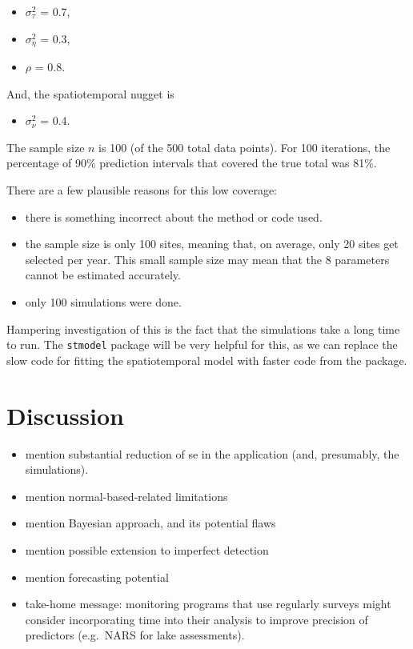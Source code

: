 \documentclass[]{interact}
\theoremstyle{plain}%
\theoremstyle{definition}
\theoremstyle{remark}
\def\tightlist{}
\begin{document}
\begin{itemize}
\tightlist
\item
  \(\sigma^2_{\tau}\) = 0.7,
\item
  \(\sigma^2_{\eta}\) = 0.3,
\item
  \(\rho\) = 0.8.
\end{itemize}

And, the spatiotemporal nugget is

\begin{itemize}
\tightlist
\item
  \(\sigma^2_{\nu}\) = 0.4.
\end{itemize}

The sample size \(n\) is 100 (of the 500 total data points). For 100
iterations, the percentage of 90\% prediction intervals that covered the
true total was 81\%.

There are a few plausible reasons for this low coverage:

\begin{itemize}
\tightlist
\item
  there is something incorrect about the method or code used.
\item
  the sample size is only 100 sites, meaning that, on average, only 20
  sites get selected per year. This small sample size may mean that the
  8 parameters cannot be estimated accurately.
\item
  only 100 simulations were done.
\end{itemize}

Hampering investigation of this is the fact that the simulations take a
long time to run. The \texttt{stmodel} package will be very helpful for
this, as we can replace the slow code for fitting the spatiotemporal
model with faster code from the package.

\section{Discussion} \label{section:Discussion}

\begin{itemize}
\item
  mention substantial reduction of se in the application (and,
  presumably, the simulations).
\item
  mention normal-based-related limitations
\item
  mention Bayesian approach, and its potential flaws
\item
  mention possible extension to imperfect detection
\item
  mention forecasting potential
\item
  take-home message: monitoring programs that use regularly surveys
  might consider incorporating time into their analysis to improve
  precision of predictors (e.g.~NARS for lake assessments).
\end{itemize}



\end{document}
